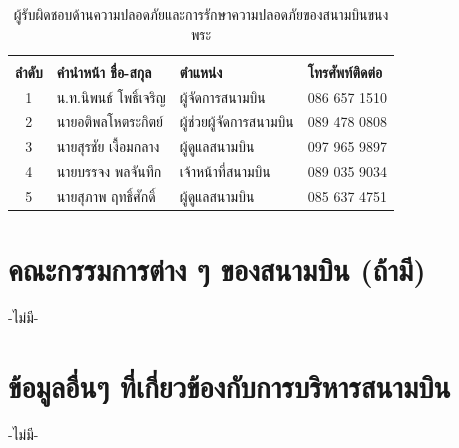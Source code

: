 \begin{table}[ht]
\caption{ผู้รับผิดชอบด้านความปลอดภัยและการรักษาความปลอดภัยของสนามบินขนงพระ}
\begin{center}
\begin{tabular}{clll}
 & & & \\
\textbf{ลำดับ} & \textbf{คำนำหน้า ชื่อ-สกุล} & \textbf{ตำแหน่ง} & \textbf{โทรศัพท์ติดต่อ} \\
1 & น.ท.นิพนธ์ โพธิ์เจริญ & ผู้จัดการสนามบิน & 086 657 1510 \\
2 & นายอติพลโหตระกิตย์ & ผู้ช่วยผู้จัดการสนามบิน & 089 478 0808 \\
3 & นายสุรชัย เงื้อมกลาง & ผู้ดูแลสนามบิน & 097 965 9897 \\
4 & นายบรรจง พลจันทึก & เจ้าหน้าที่สนามบิน & 089 035 9034 \\
5 & นายสุภาพ ฤทธิ์ศักดิ์ & ผู้ดูแลสนามบิน & 085 637 4751 \\ 
\end{tabular}
\end{center}
\label{ผู้รับผิดชอบด้านความปลอดภัยและด้านการรักษาความปลอดภัยของสนามบินขนงพระ}
\end{table}%

\section{คณะกรรมการต่าง ๆ ของสนามบิน (ถ้ามี)}

-ไม่มี-

\section{ข้อมูลอื่นๆ ที่เกี่ยวข้องกับการบริหารสนามบิน}

-ไม่มี-
